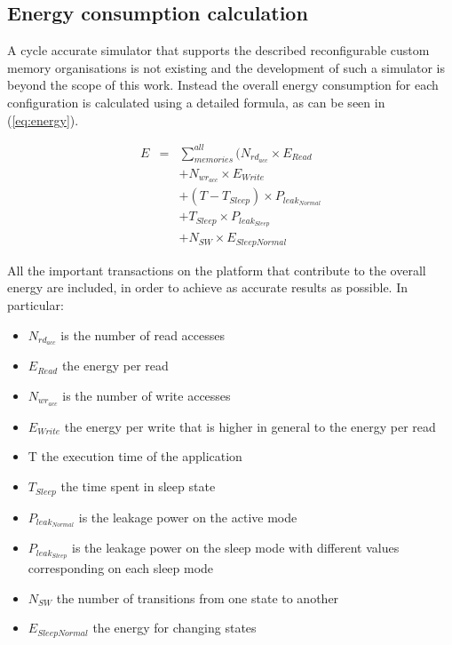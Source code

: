 \documentclass[a4paper,conference]{IEEEtran}
\begin{document}
\subsection{Energy consumption calculation}

A cycle accurate simulator that supports the described reconfigurable custom memory organisations is not existing and the development of such a simulator is beyond the scope of this work.  Instead the overall energy consumption for each configuration is calculated using a detailed formula, as can be seen in (\ref{eq:energy}). 

\setlength{\arraycolsep}{0.0em}
\begin{eqnarray}
\label{eq:energy}
 E &{}= {}&\sum\limits_{memories}^{all}  ( N_{rd_{acc}} \times E_{Read} \nonumber\\
		&&+ N_{wr_{acc}} \times E_{Write} \nonumber\\
		&&+ (T - T_{Sleep}) \times P_{leak_{Normal}} \nonumber\\
		&&+ T_{Sleep} \times P_{leak_{Sleep}} \nonumber\\ 
		&& + N_{SW} \times E_{SleepNormal}
\end{eqnarray}
\setlength{\arraycolsep}{5pt}

All the important transactions on the platform that contribute to the overall energy are included, in order to achieve as accurate results as possible. In particular:
\begin{itemize}
\item $N_{rd_{acc}}$ is the number of read accesses
\item $E_{Read}$ the energy per read
\item $N_{wr_{acc}}$ is the number of write accesses 
\item $E_{Write}$ the energy per write that is higher in general to the energy per read 
\item T the execution time of the application
\item $T_{Sleep}$ the time spent in sleep state
\item $P_{leak_{Normal}}$ is the leakage power on the active mode 
\item $P_{leak_{Sleep}}$ is the leakage power on the sleep mode with different values corresponding on each sleep mode 
\item $N_{SW}$ the number of transitions from one state to another
\item $E_{SleepNormal}$ the energy for changing states
\end{itemize}
\end{document}
